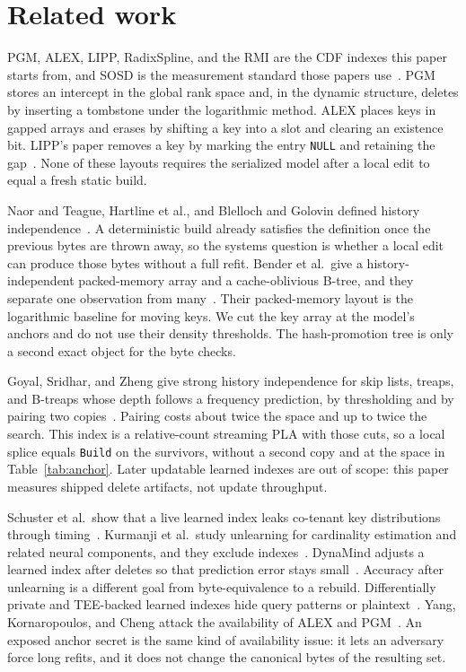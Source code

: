 \documentclass[conference]{IEEEtran}
\begin{document}
\section{Related work}

PGM, ALEX, LIPP, RadixSpline, and the RMI are the CDF indexes this paper starts from, and SOSD is the measurement standard those papers use~\cite{ferragina2020pgm,ding2020alex,wu2021lipp,kipf2020spline,kraska2018,kipf2019sosd}.
PGM stores an intercept in the global rank space and, in the dynamic structure, deletes by inserting a tombstone under the logarithmic method.
ALEX places keys in gapped arrays and erases by shifting a key into a slot and clearing an existence bit.
LIPP's paper removes a key by marking the entry \texttt{NULL} and retaining the gap~\cite{wu2021lipp}.
None of these layouts requires the serialized model after a local edit to equal a fresh static build.

Naor and Teague, Hartline et al., and Blelloch and Golovin defined history independence~\cite{naor2001,hartline2005,blelloch2007}.
A deterministic build already satisfies the definition once the previous bytes are thrown away, so the systems question is whether a local edit can produce those bytes without a full refit.
Bender et al.\ give a history-independent packed-memory array and a cache-oblivious B-tree, and they separate one observation from many~\cite{bender2016}.
Their packed-memory layout is the logarithmic baseline for moving keys.
We cut the key array at the model's anchors and do not use their density thresholds.
The hash-promotion tree is only a second exact object for the byte checks.

Goyal, Sridhar, and Zheng give strong history independence for skip lists, treaps, and B-treaps whose depth follows a frequency prediction, by thresholding and by pairing two copies~\cite{goyal2025}.
Pairing costs about twice the space and up to twice the search.
This index is a relative-count streaming PLA with those cuts, so a local splice equals \texttt{Build} on the survivors, without a second copy and at the space in Table~\ref{tab:anchor}.
Later updatable learned indexes are out of scope: this paper measures shipped delete artifacts, not update throughput.

Schuster et al.\ show that a live learned index leaks co-tenant key distributions through timing~\cite{schuster2025}.
Kurmanji et al.\ study unlearning for cardinality estimation and related neural components, and they exclude indexes~\cite{kurmanji2024}.
DynaMind adjusts a learned index after deletes so that prediction error stays small~\cite{dynamind2026}.
Accuracy after unlearning is a different goal from byte-equivalence to a rebuild.
Differentially private and TEE-backed learned indexes hide query patterns or plaintext~\cite{du2024dp,cao2025letindex,wang2025sls}.
Yang, Kornaropoulos, and Cheng attack the availability of ALEX and PGM~\cite{yang2024}.
An exposed anchor secret is the same kind of availability issue: it lets an adversary force long refits, and it does not change the canonical bytes of the resulting set.
\end{document}
